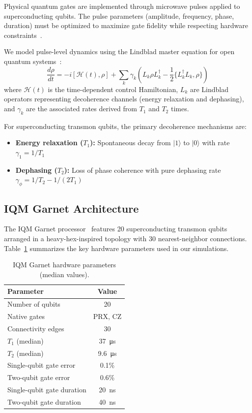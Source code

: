 \documentclass[journal]{IEEEtran}
\newcommand{\ham}{\mathcal{H}}
\begin{document}
Physical quantum gates are implemented through microwave pulses applied to superconducting qubits. The pulse parameters (amplitude, frequency, phase, duration) must be optimized to maximize gate fidelity while respecting hardware constraints~\cite{motzoi2009simple}.

We model pulse-level dynamics using the Lindblad master equation for open quantum systems~\cite{lindblad1976generators}:
\begin{equation}
    \frac{d\rho}{dt} = -i[\ham(t), \rho] + \sum_k \gamma_k \left( L_k \rho L_k^{\dagger} - \frac{1}{2}\{L_k^{\dagger}L_k, \rho\} \right)
    \label{eq:lindblad}
\end{equation}
where $\ham(t)$ is the time-dependent control Hamiltonian, $L_k$ are Lindblad operators representing decoherence channels (energy relaxation and dephasing), and $\gamma_k$ are the associated rates derived from $T_1$ and $T_2$ times.

For superconducting transmon qubits, the primary decoherence mechanisms are:
\begin{itemize}
    \item \textbf{Energy relaxation ($T_1$):} Spontaneous decay from $|1\rangle$ to $|0\rangle$ with rate $\gamma_1 = 1/T_1$
    \item \textbf{Dephasing ($T_2$):} Loss of phase coherence with pure dephasing rate $\gamma_\phi = 1/T_2 - 1/(2T_1)$
\end{itemize}

\subsection{IQM Garnet Architecture}

The IQM Garnet processor~\cite{iqm2024garnet} features 20 superconducting transmon qubits arranged in a heavy-hex-inspired topology with 30 nearest-neighbor connections. Table~\ref{tab:hardware} summarizes the key hardware parameters used in our simulations.

\begin{table}[t]
\caption{IQM Garnet hardware parameters (median values).}
\label{tab:hardware}
\centering
\begin{tabular}{lc}
\hline
Parameter & Value \\
\hline
Number of qubits & 20 \\
Native gates & PRX, CZ \\
Connectivity edges & 30 \\
$T_1$ (median) & \SI{37}{\micro\second} \\
$T_2$ (median) & \SI{9.6}{\micro\second} \\
Single-qubit gate error & 0.1\% \\
Two-qubit gate error & 0.6\% \\
Single-qubit gate duration & \SI{20}{\nano\second} \\
Two-qubit gate duration & \SI{40}{\nano\second} \\
\hline
\end{tabular}
\end{table}
\end{document}
